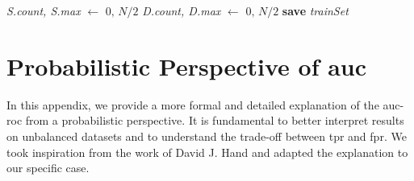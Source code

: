 \begin{appendices}
\begin{algorithm}
        \textit{S.count, S.max} $\gets$ $0, \,N/2$\;
        \textit{D.count, D.max} $\gets$ $0, \,N/2$\;
        \textbf{save} \textit{trainSet}\;
    \end{algorithm}

\chapter{Probabilistic Perspective of \ac{auc}}
\label{appendix:auc_probabilistic}
In this appendix, we provide a more formal and detailed explanation of the \ac{auc}-\ac{roc}
from a probabilistic perspective. It is fundamental to better interpret results on 
unbalanced datasets and to understand the trade-off between \ac{tpr} and \ac{fpr}.
We took inspiration from the work of David J. Hand \cite{roc_auc_probabilistic} 
and adapted the explanation to our specific case.


\end{appendices}

